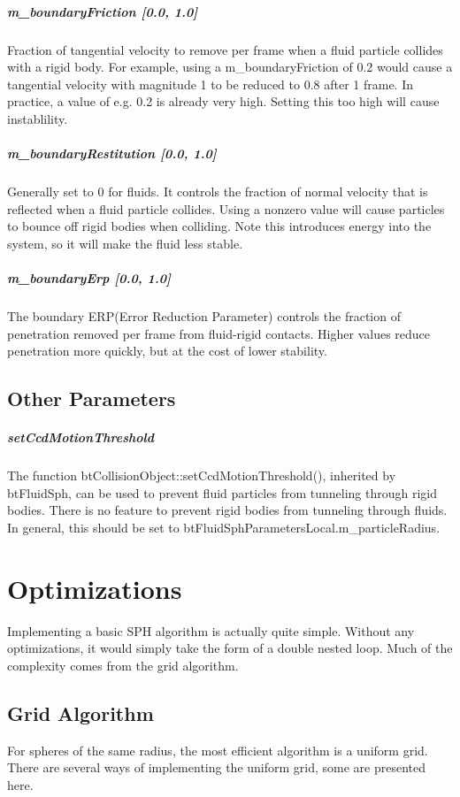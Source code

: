 \documentclass[]{article}
\begin{document}
			\subparagraph{m\_boundaryFriction [0.0, 1.0]}
				Fraction of tangential velocity to remove per frame when a fluid particle collides with a rigid body. For 
				example, using a m\_boundaryFriction of 0.2 would cause a tangential velocity with magnitude 1 to be 
				reduced to 0.8 after 1 frame. In practice, a value of e.g. 0.2 is already very high. Setting this too high 
				will cause instablility.
				
			\subparagraph{m\_boundaryRestitution [0.0, 1.0]}
				Generally set to 0 for fluids. It controls the fraction of normal velocity that is reflected when a fluid 
				particle collides. Using a nonzero value will cause particles to bounce off rigid bodies when colliding. 
				Note this introduces energy into the system, so it will make the fluid less stable.
				
			\subparagraph{m\_boundaryErp [0.0, 1.0]}
				The boundary ERP(Error Reduction Parameter) controls the fraction of penetration removed per frame from
			fluid-rigid contacts. Higher values reduce penetration more quickly, but at the cost of lower stability.
		
	\subsection{Other Parameters}
		\subparagraph{setCcdMotionThreshold}
			The function btCollisionObject::setCcdMotionThreshold(), inherited by btFluidSph,
			can be used to prevent fluid particles from tunneling through rigid bodies.
			There is no feature to prevent rigid bodies from tunneling through fluids.
			In general, this should be set to btFluidSphParametersLocal.m\_particleRadius.
			
\pagebreak		
\section{Optimizations}
	Implementing a basic SPH algorithm is actually quite simple. Without any optimizations, 
	it would simply take the form of a double nested loop. Much of the complexity comes from the grid algorithm.
		
	\subsection{Grid Algorithm}
		For spheres of the same radius, the most efficient algorithm is a uniform grid.
		There are several ways of implementing the uniform grid, some are presented here.\\
		
\end{document}
